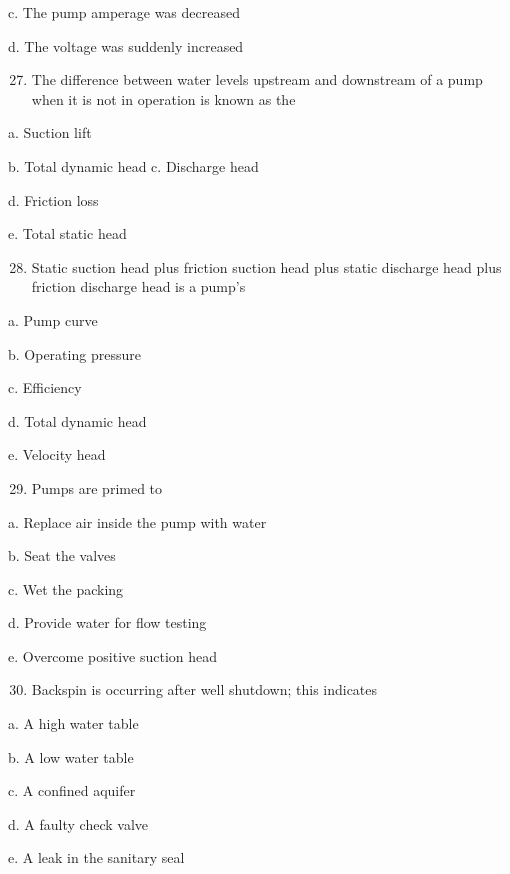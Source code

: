 \documentclass[10pt]{article}
\begin{document}
\begin{enumerate}
\begin{enumerate}
c. The pump amperage was decreased

d. The voltage was suddenly increased

\begin{enumerate}
  \setcounter{enumi}{26}
  \item The difference between water levels upstream and downstream of a pump when it is not in operation is known as the
\end{enumerate}

a. Suction lift

b. Total dynamic head c. Discharge head

d. Friction loss

e. Total static head

\begin{enumerate}
  \setcounter{enumi}{27}
  \item Static suction head plus friction suction head plus static discharge head plus friction discharge head is a pump's
\end{enumerate}

a. Pump curve

b. Operating pressure

c. Efficiency

d. Total dynamic head

e. Velocity head

\begin{enumerate}
  \setcounter{enumi}{28}
  \item Pumps are primed to
\end{enumerate}

a. Replace air inside the pump with water

b. Seat the valves

c. Wet the packing

d. Provide water for flow testing

e. Overcome positive suction head

\begin{enumerate}
  \setcounter{enumi}{29}
  \item Backspin is occurring after well shutdown; this indicates
\end{enumerate}

a. A high water table

b. A low water table

c. A confined aquifer

d. A faulty check valve

e. A leak in the sanitary seal


\end{enumerate}
\end{enumerate}
\end{document}
